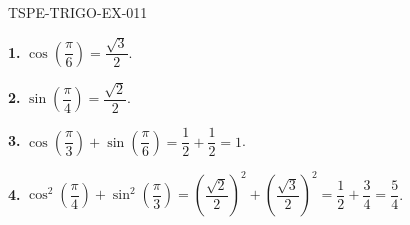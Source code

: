 \begin{corrige}{TSPE-TRIGO-EX-011}

\textbf{1.} $\cos\!\left(\dfrac{\pi}{6}\right) = \dfrac{\sqrt{3}}{2}$.

\textbf{2.} $\sin\!\left(\dfrac{\pi}{4}\right) = \dfrac{\sqrt{2}}{2}$.

\textbf{3.} $\cos\!\left(\dfrac{\pi}{3}\right) + \sin\!\left(\dfrac{\pi}{6}\right) = \dfrac{1}{2} + \dfrac{1}{2} = 1$.

\textbf{4.} $\cos^2\!\left(\dfrac{\pi}{4}\right) + \sin^2\!\left(\dfrac{\pi}{3}\right) = \left(\dfrac{\sqrt{2}}{2}\right)^2 + \left(\dfrac{\sqrt{3}}{2}\right)^2 = \dfrac{1}{2} + \dfrac{3}{4} = \dfrac{5}{4}$.

\end{corrige}
